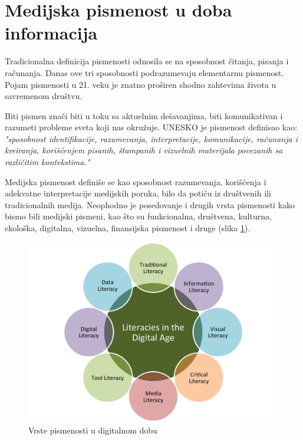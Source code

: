 \documentclass[a4paper]{article}
\begin{document}
\newpage
\section{Medijska pismenost u doba informacija}
\label{sec:naslov4}

Tradicionalna definicija pismenosti odnosila se na sposobnost čitanja, pisanja i računanja. Danas ove tri sposobnosti podrazumevaju elementarnu pismenost. Pojam pismenosti u 21. veku je znatno proširen shodno zahtevima života u savremenom društvu.

Biti pismen znači biti u toku sa aktuelnim dešavanjima, biti komunikativan i razumeti probleme sveta koji nas okružuje. UNESKO je pismenost definisao kao: \noindent \textit{"sposobnost identifikacije, razumevanja, interpretacije, komunikacije, računanja i kreiranja, korišćenjem pisanih, štampanih i vizuelnih materijala povezanih sa različitim kontekstima."}

Medijska pismenost definiše se kao sposobnost razumevanja, korišćenja i adekvatne interpretacije medijskih poruka, bilo da potiču iz društvenih ili tradicionalnih medija. Neophodno je posedovanje i drugih vrsta pismenosti kako bismo bili medijski pismeni, kao što su funkcionalna, društvena, kulturna, ekološka, digitalna, vizuelna, finansijska pismenost i druge \cite{literacy} (slika \ref{fig:literacies}).  

\begin{figure}[ht!]
\begin{center}
\includegraphics[scale=0.35]{literacies.png}
\end{center}
\caption{Vrste pismenosti u digitalnom dobu}
\label{fig:literacies}
\end{figure}
\end{document}
